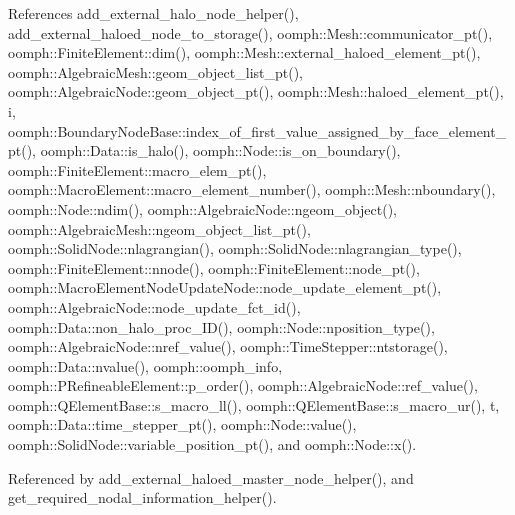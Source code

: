 References add\+\_\+external\+\_\+halo\+\_\+node\+\_\+helper(), add\+\_\+external\+\_\+haloed\+\_\+node\+\_\+to\+\_\+storage(), oomph\+::\+Mesh\+::communicator\+\_\+pt(), oomph\+::\+Finite\+Element\+::dim(), oomph\+::\+Mesh\+::external\+\_\+haloed\+\_\+element\+\_\+pt(), oomph\+::\+Algebraic\+Mesh\+::geom\+\_\+object\+\_\+list\+\_\+pt(), oomph\+::\+Algebraic\+Node\+::geom\+\_\+object\+\_\+pt(), oomph\+::\+Mesh\+::haloed\+\_\+element\+\_\+pt(), i, oomph\+::\+Boundary\+Node\+Base\+::index\+\_\+of\+\_\+first\+\_\+value\+\_\+assigned\+\_\+by\+\_\+face\+\_\+element\+\_\+pt(), oomph\+::\+Data\+::is\+\_\+halo(), oomph\+::\+Node\+::is\+\_\+on\+\_\+boundary(), oomph\+::\+Finite\+Element\+::macro\+\_\+elem\+\_\+pt(), oomph\+::\+Macro\+Element\+::macro\+\_\+element\+\_\+number(), oomph\+::\+Mesh\+::nboundary(), oomph\+::\+Node\+::ndim(), oomph\+::\+Algebraic\+Node\+::ngeom\+\_\+object(), oomph\+::\+Algebraic\+Mesh\+::ngeom\+\_\+object\+\_\+list\+\_\+pt(), oomph\+::\+Solid\+Node\+::nlagrangian(), oomph\+::\+Solid\+Node\+::nlagrangian\+\_\+type(), oomph\+::\+Finite\+Element\+::nnode(), oomph\+::\+Finite\+Element\+::node\+\_\+pt(), oomph\+::\+Macro\+Element\+Node\+Update\+Node\+::node\+\_\+update\+\_\+element\+\_\+pt(), oomph\+::\+Algebraic\+Node\+::node\+\_\+update\+\_\+fct\+\_\+id(), oomph\+::\+Data\+::non\+\_\+halo\+\_\+proc\+\_\+\+I\+D(), oomph\+::\+Node\+::nposition\+\_\+type(), oomph\+::\+Algebraic\+Node\+::nref\+\_\+value(), oomph\+::\+Time\+Stepper\+::ntstorage(), oomph\+::\+Data\+::nvalue(), oomph\+::oomph\+\_\+info, oomph\+::\+P\+Refineable\+Element\+::p\+\_\+order(), oomph\+::\+Algebraic\+Node\+::ref\+\_\+value(), oomph\+::\+Q\+Element\+Base\+::s\+\_\+macro\+\_\+ll(), oomph\+::\+Q\+Element\+Base\+::s\+\_\+macro\+\_\+ur(), t, oomph\+::\+Data\+::time\+\_\+stepper\+\_\+pt(), oomph\+::\+Node\+::value(), oomph\+::\+Solid\+Node\+::variable\+\_\+position\+\_\+pt(), and oomph\+::\+Node\+::x().



Referenced by add\+\_\+external\+\_\+haloed\+\_\+master\+\_\+node\+\_\+helper(), and get\+\_\+required\+\_\+nodal\+\_\+information\+\_\+helper().

\mbox{\label{namespaceoomph_1_1Missing__masters__functions_acc3c8930de1090a3dd7d4a3ddb55cacb}} 
